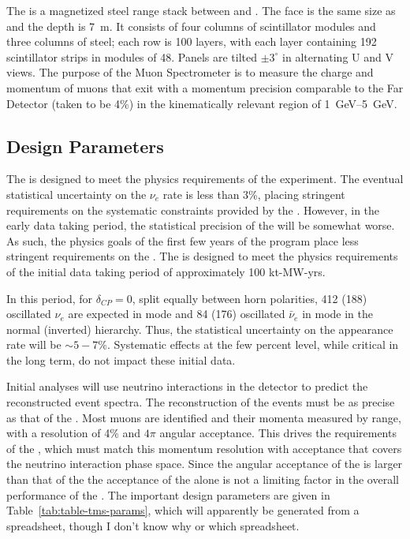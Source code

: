 The  is a magnetized steel range stack between  and .  The face is the same size as  and the depth is \SI{7}{\m}.  It consists of four columns of scintillator modules and three columns of steel; each row is \num{100} layers, with each layer containing \num{192} scintillator strips in modules of \num{48}. Panels are tilted $\pm 3^{\circ}$ in alternating U and V views. The purpose of the Muon Spectrometer is to measure the charge and momentum of muons that exit  with a momentum precision comparable to the Far Detector (taken to be 4\%) in the kinematically relevant region of  \SIrange{1}{5}{\GeV}.

\subsection{Design Parameters}
\label{sec:tms-ovvw-param}

The   is designed to meet the physics requirements of the  experiment. The eventual statistical uncertainty on the  $\nu_{e}$ rate is less than 3\%, placing stringent requirements on the systematic constraints provided by the . However, in the early data taking period, the statistical precision of the  will be somewhat worse. As such, the physics goals of the first few years of the  program place less stringent requirements on the . The  is designed to meet the physics requirements of the initial data taking period of approximately 100 kt-MW-yrs. 

In this period, for $\delta_{CP} = 0$, split equally between horn polarities, 412 (188) oscillated $\nu_{e}$ are expected in  mode and 84 (176) oscillated $\bar{\nu}_{e}$ in  mode in the normal (inverted) hierarchy. Thus, the statistical uncertainty on the appearance rate will be $\sim 5-7\%$. Systematic effects at the few percent level, while critical in the long term, do not impact these initial data.

Initial  analyses will use neutrino interactions in the  detector to predict the  reconstructed event spectra. The reconstruction of the  events must be as precise as that of the . Most  muons are identified and their momenta measured by range, with a resolution of 4\% and $4\pi$ angular acceptance. This drives the requirements of the , which must match this momentum resolution with acceptance that covers the neutrino interaction phase space.
Since the angular acceptance of the  is larger than that of the  the acceptance of the  alone is not a limiting factor in the overall performance of the .
The important design parameters are given in Table~\ref{tab:table-tms-params}, which will apparently be generated from a spreadsheet, though I don't know why or which spreadsheet.

